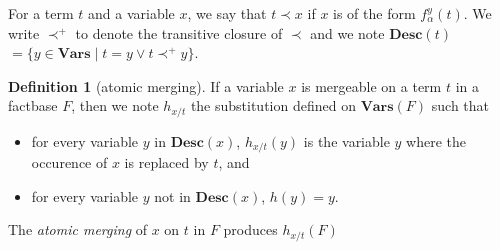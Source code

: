 \documentclass{article}
\theoremstyle{definition}
\newtheorem{definition}{Definition}[section]
\theoremstyle{remark}
\newcommand{\Vars}{\textbf{Vars}}
\newcommand{\des}{\textbf{Desc}}
\begin{document}
For a term $t$ and a variable $x$, we say that $t \prec x$ if $x$ is of the form $f_\alpha^y(t)$. We write $\prec^+$ to denote the transitive closure of $\prec$ and we note \emph{$\des(t)$}$= \{y \in \Vars \mid t = y \vee t \prec^+ y\}$.



\begin{definition}[atomic merging]
If a variable $x$ is mergeable on a term $t$ in a factbase $F$, then we note $h_{x/t}$ the substitution defined on $\Vars(F)$ such that 
\begin{itemize}
\item for every variable $y$ in $\des(x)$, $h_{x/t}(y)$ is the variable $y$ where the occurence of $x$ is replaced by $t$, and 
\item for every variable $y$ not in $\des(x)$, $h(y) = y$. 
\end{itemize}

The \emph{atomic merging} of $x$ on $t$ in $F$ produces $h_{x/t}(F)$ 
\end{definition}
\end{document}
